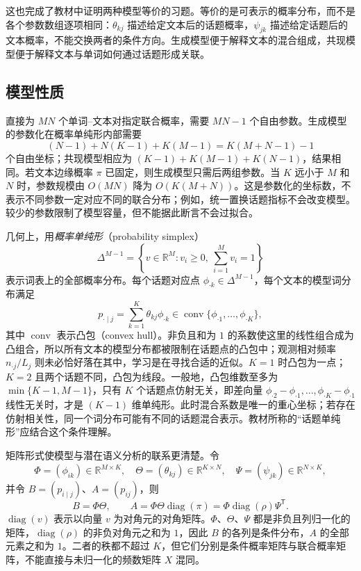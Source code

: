 这也完成了教材中证明两种模型等价的习题。等价的是可表示的概率分布，而不是各个参数数组逐项相同：$\theta_{kj}$ 描述给定文本后的话题概率，$\psi_{jk}$ 描述给定话题后的文本概率，不能交换两者的条件方向。生成模型便于解释文本的混合组成，共现模型便于解释文本与单词如何通过话题形成关联。

\subsection{模型性质}
\label{subsec:lh-plsa-properties}

直接为 $MN$ 个单词--文本对指定联合概率，需要 $MN-1$ 个自由参数。生成模型的参数化在概率单纯形内部需要
\begin{equation}
(N-1)+N(K-1)+K(M-1)=K(M+N-1)-1
\label{eq:lh-plsa-parameter-count}
\end{equation}
个自由坐标；共现模型相应为 $(K-1)+K(M-1)+K(N-1)$，结果相同。若文本边缘概率 $\pi$ 已固定，则生成模型只需后两组参数。当 $K$ 远小于 $M$ 和 $N$ 时，参数规模由 $O(MN)$ 降为 $O(K(M+N))$。这是参数化的坐标数，不表示不同参数一定对应不同的联合分布；例如，统一置换话题指标不会改变模型。较少的参数限制了模型容量，但不能据此断言不会过拟合。

几何上，用\emph{概率单纯形}（probability simplex）
\begin{equation}
\Delta^{M-1}=\left\{v\in\mathbb R^M:
v_i\geq0,\ \sum_{i=1}^M v_i=1\right\}
\label{eq:lh-plsa-simplex}
\end{equation}
表示词表上的全部概率分布。每个话题对应点 $\phi_{\cdot k}\in\Delta^{M-1}$，每个文本的模型词分布满足
\begin{equation}
p_{\cdot\mid j}=\sum_{k=1}^K\theta_{kj}\phi_{\cdot k}
\in\operatorname{conv}\{\phi_{\cdot1},\ldots,\phi_{\cdot K}\},
\label{eq:lh-plsa-convex-hull}
\end{equation}
其中 $\operatorname{conv}$ 表示凸包（convex hull）。非负且和为 $1$ 的系数使这里的线性组合成为凸组合，所以所有文本的模型分布都被限制在话题点的凸包中；观测相对频率 $n_{\cdot j}/L_j$ 则未必恰好落在其中，学习是在寻找合适的近似。$K=1$ 时凸包为一点；$K=2$ 且两个话题不同，凸包为线段。一般地，凸包维数至多为 $\min\{K-1,M-1\}$，只有 $K$ 个话题点仿射无关，即差向量 $\phi_{\cdot2}-\phi_{\cdot1},\ldots,\phi_{\cdot K}-\phi_{\cdot1}$ 线性无关时，才是 $(K-1)$ 维单纯形。此时混合系数是唯一的重心坐标；若存在仿射相关性，同一个词分布可能有不同的话题混合表示。教材所称的“话题单纯形”应结合这个条件理解。

矩阵形式使模型与潜在语义分析的联系更清楚。令
\[
\Phi=(\phi_{ik})\in\mathbb R^{M\times K},\quad
\Theta=(\theta_{kj})\in\mathbb R^{K\times N},\quad
\Psi=(\psi_{jk})\in\mathbb R^{N\times K},
\]
并令 $B=(p_{i\mid j})$、$A=(p_{ij})$，则
\begin{equation}
B=\Phi\Theta,\qquad
A=\Phi\Theta\operatorname{diag}(\pi)
=\Phi\operatorname{diag}(\rho)\Psi^{\mathsf T}.
\label{eq:lh-plsa-matrix-factorization}
\end{equation}
$\operatorname{diag}(v)$ 表示以向量 $v$ 为对角元的对角矩阵。$\Phi$、$\Theta$、$\Psi$ 都是非负且列归一化的矩阵，$\operatorname{diag}(\rho)$ 的非负对角元之和为 $1$，因此 $B$ 的各列是条件分布，$A$ 的全部元素之和为 $1$。二者的秩都不超过 $K$，但它们分别是条件概率矩阵与联合概率矩阵，不能直接与未归一化的频数矩阵 $X$ 混同。

